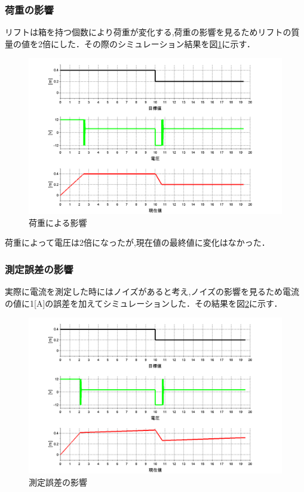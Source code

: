 \subsubsection{荷重の影響}
リフトは箱を持つ個数により荷重が変化する,荷重の影響を見るためリフトの質量の値を2倍にした．その際のシミュレーション結果を図\ref{fig:sim4}に示す．

\begin{figure}[htbp]
 \begin{center}
    \includegraphics[width=150mm]{img/sim4.bmp}
    \end{center}
  \caption{荷重による影響}
 \label{fig:sim4}
\end{figure}

荷重によって電圧は2倍になったが,現在値の最終値に変化はなかった．

\subsubsection{測定誤差の影響}
実際に電流を測定した時にはノイズがあると考え,ノイズの影響を見るため電流の値に1[A]の誤差を加えてシミュレーションした．その結果を図\ref{fig:sim5}に示す．

\begin{figure}[htbp]
 \begin{center}
    \includegraphics[width=150mm]{img/sim5.bmp}
    \end{center}
  \caption{測定誤差の影響}
 \label{fig:sim5}
\end{figure}

